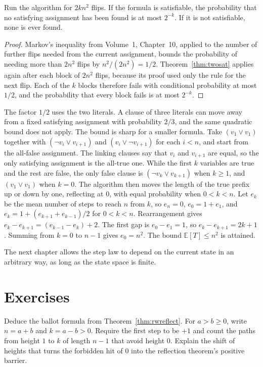 \begin{corollary}[repetition]\label{cor:twosat}
Run the algorithm for $2kn^2$ flips. If the formula is satisfiable, the probability that no satisfying assignment has been found is at most $2^{-k}$. If it is not satisfiable, none is ever found.
\end{corollary}
\begin{proof}
Markov's inequality from Volume~1, Chapter~10, applied to the number of further flips needed from the current assignment, bounds the probability of needing more than $2n^2$ flips by $n^2/(2n^2)=1/2$. Theorem~\ref{thm:twosat} applies again after each block of $2n^2$ flips, because its proof used only the rule for the next flip. Each of the $k$ blocks therefore fails with conditional probability at most $1/2$, and the probability that every block fails is at most $2^{-k}$.
\end{proof}

The factor $1/2$ uses the two literals. A clause of three literals can move away from a fixed satisfying assignment with probability $2/3$, and the same quadratic bound does not apply. The bound is sharp for a smaller formula. Take $(v_1\vee v_1)$ together with $(\neg v_i\vee v_{i+1})$ and $(v_i\vee\neg v_{i+1})$ for each $i<n$, and start from the all-false assignment. The linking clauses say that $v_i$ and $v_{i+1}$ are equal, so the only satisfying assignment is the all-true one. While the first $k$ variables are true and the rest are false, the only false clause is $(\neg v_k\vee v_{k+1})$ when $k\ge1$, and $(v_1\vee v_1)$ when $k=0$. The algorithm then moves the length of the true prefix up or down by one, reflecting at $0$, with equal probability when $0<k<n$. Let $e_k$ be the mean number of steps to reach $n$ from $k$, so $e_n=0$, $e_0=1+e_1$, and $e_k=1+(e_{k+1}+e_{k-1})/2$ for $0<k<n$. Rearrangement gives $e_k-e_{k+1}=(e_{k-1}-e_k)+2$. The first gap is $e_0-e_1=1$, so $e_k-e_{k+1}=2k+1$. Summing from $k=0$ to $n-1$ gives $e_0=n^2$. The bound $\mathbb E[T]\le n^2$ is attained.

The next chapter allows the step law to depend on the current state in an arbitrary way, as long as the state space is finite.

\section{Exercises}

\begin{exercise}[$\star$]\label{ex:ballotwalk}
Deduce the ballot formula from Theorem~\ref{thm:rwreflect}. For $a>b\ge0$, write $n=a+b$ and $k=a-b>0$. Require the first step to be $+1$ and count the paths from height $1$ to $k$ of length $n-1$ that avoid height $0$. Explain the shift of heights that turns the forbidden hit of $0$ into the reflection theorem's positive barrier.
\end{exercise}

